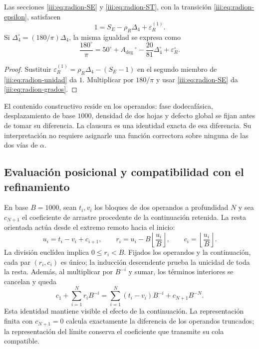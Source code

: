 \begin{theorem}
\label{iii:thm:radion-cierre}
Las secciones \eqref{iii:eq:radion-SE} y \eqref{iii:eq:radion-ST}, con la
transición \eqref{iii:eq:radion-epsilon}, satisfacen
\begin{equation}
 1=S_E-\rho_R\Delta_4+\varepsilon_R^{(1)}.
 \label{iii:eq:radion-unidad}
\end{equation}
Si $\Delta_4^\circ=(180/\pi)\Delta_4$, la misma igualdad se expresa como
\begin{equation}
 \frac{180^\circ}{\pi}
 =50^\circ+A_{\deg}\,{}^\circ
   -\frac{20}{81}\Delta_4^\circ+\varepsilon_R^\circ.
 \label{iii:eq:radion-grados}
\end{equation}
\end{theorem}
\begin{proof}
Sustituir $\varepsilon_R^{(1)}=\rho_R\Delta_4-(S_E-1)$ en el segundo
miembro de \eqref{iii:eq:radion-unidad} da $1$. Multiplicar por $180/\pi$
y usar \eqref{iii:eq:radion-SE} da \eqref{iii:eq:radion-grados}.
\end{proof}

El contenido constructivo reside en los operandos: fase dodecafásica,
desplazamiento de base $1000$, densidad de dos hojas y defecto global
se fijan antes de tomar su diferencia. La clausura es una identidad exacta
de esa diferencia. Su interpretación no requiere asignarle una función
correctora sobre ninguna de las dos vías de $\alpha$.

\subsection{Evaluación posicional y compatibilidad con el refinamiento}
\label{iii:subsec:radion-refinamiento}

En base $B=1000$, sean $t_i,v_i$ los bloques de dos operandos a profundidad
$N$ y sea $c_{N+1}$ el coeficiente de arrastre procedente de la continuación
retenida. La resta orientada actúa desde el extremo remoto hacia el inicio:
\begin{equation}
 u_i=t_i-v_i+c_{i+1},\qquad
 r_i=u_i-B\left\lfloor\frac{u_i}{B}\right\rfloor,\qquad
 c_i=\left\lfloor\frac{u_i}{B}\right\rfloor.
 \label{iii:eq:radion-subcarry}
\end{equation}
La división euclídea implica $0\leq r_i<B$. Fijados los operandos y la
continuación, cada par $(r_i,c_i)$ es único; la inducción descendente prueba
la unicidad de toda la resta. Además, al multiplicar por $B^{-i}$ y sumar,
los términos interiores se cancelan y queda
\begin{equation}
 c_1+\sum_{i=1}^N r_iB^{-i}
 =\sum_{i=1}^N(t_i-v_i)B^{-i}+c_{N+1}B^{-N}.
 \label{iii:eq:radion-subcarry-telescopio}
\end{equation}
Esta identidad mantiene visible el efecto de la continuación. La
representación finita con $c_{N+1}=0$ calcula exactamente la diferencia
de los operandos truncados; la representación del límite conserva el
coeficiente que transmite su cola compatible.

